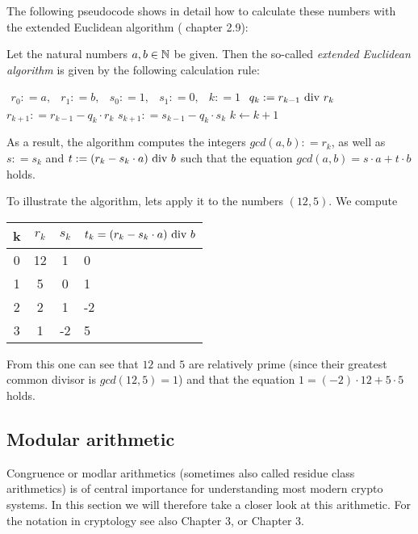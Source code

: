 The following pseudocode shows in detail how to calculate these numbers with the extended Euclidean algorithm (\cite{JB} chapter 2.9):
\begin{definition} 
\label{theorem: ext_Euclid}
Let the natural numbers $ a, b \in \mathbb{N} $ be given. Then the so-called \textit{extended Euclidean algorithm} is given by the following calculation rule:
\begin{algorithmic}
\State $ \begin{array}{ccccc}
r_0: = a, & r_1: = b, & s_0: = 1, & s_1: = 0, & k: = 1
\end{array} $
\State $ q_k: = r_{k-1} \text{ div } r_k $
\State $ r_{k + 1}: = r_{k-1} -q_k \cdot r_k $
\State $ s_{k + 1}: = s_{k-1} -q_k \cdot s_k $
\State $ k \gets k + 1 $
\EndWhile
\end{algorithmic}
As a result, the algorithm computes the integers $ gcd (a, b): = r_k $, as well as $ s: = s_k $ and $ t: = (r_k-s_k \cdot a) \text{ div } b $ such that the equation
$ gcd (a, b) = s \cdot a + t \cdot b $ holds.
\end{definition}
\begin{example} To illustrate the algorithm, lets apply it to the numbers $ (12,5) $. We compute
\begin{center}
  \begin{tabular}{c | c c l}
    k & $ r_k $ & $ s_k $ & $ t_k = (r_k-s_k \cdot a) \text{ div } b $ \\\hline
    0 & 12 & 1 & 0 \\
    1 & 5 & 0 & 1 \\
    2 & 2 & 1 & -2 \\
    3 & 1 & -2 & 5 \\
  \end{tabular}
\end{center}
From this one can see that $ 12 $ and $ 5 $ are relatively prime (since their greatest common divisor is $ gcd (12, 5) = 1 $) and that the equation $ 1 = (-2) \cdot 12 + 5 \cdot 5 $ holds.
\end{example}

\subsection{Modular arithmetic}
Congruence or modlar arithmetics (sometimes also called residue class arithmetics) is of central importance for understanding most modern crypto systems. In this section we will therefore take a closer look at this arithmetic. For the notation in cryptology see also \cite{JB} Chapter 3, or \cite{AL} Chapter 3.

